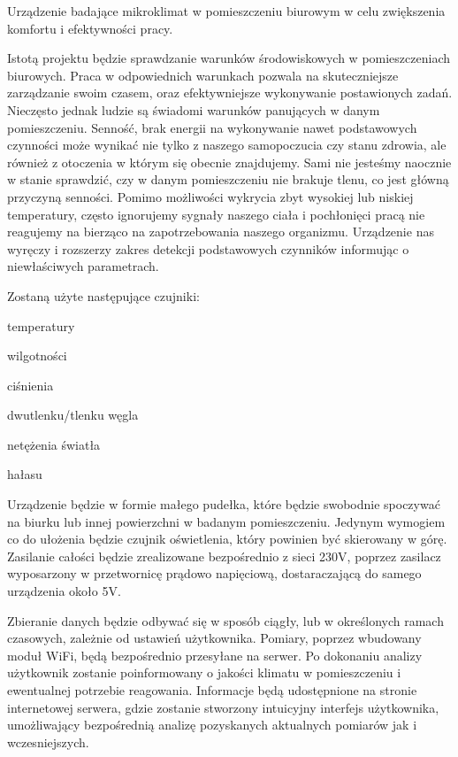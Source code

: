 \documentclass[10pt, a4paper]{article}
\begin{document}
Urządzenie badające mikroklimat w pomieszczeniu biurowym w celu zwiększenia komfortu i efektywności pracy.


Istotą projektu będzie sprawdzanie warunków środowiskowych w pomieszczeniach biurowych. 
Praca w odpowiednich warunkach pozwala na skuteczniejsze zarządzanie swoim czasem, oraz efektywniejsze wykonywanie postawionych zadań. Nieczęsto jednak ludzie są świadomi warunków panujących w danym pomieszczeniu. Senność, brak energii na wykonywanie nawet podstawowych czynności może wynikać nie tylko z naszego samopoczucia czy stanu zdrowia, ale również z otoczenia w którym się obecnie znajdujemy. Sami nie jesteśmy naocznie w stanie sprawdzić, czy w danym pomieszczeniu nie brakuje tlenu, co jest główną przyczyną senności. Pomimo możliwości wykrycia zbyt wysokiej lub niskiej temperatury, często ignorujemy sygnały naszego ciała i pochłonięci pracą nie reagujemy na bierząco na zapotrzebowania naszego organizmu. Urządzenie nas wyręczy i rozszerzy zakres detekcji podstawowych czynników informując o niewłaściwych parametrach.

Zostaną użyte następujące czujniki:

\begin{description}[font=$\bullet$~\normalfont]
\item temperatury
\item wilgotności
\item ciśnienia
\item dwutlenku/tlenku węgla
\item netężenia światła
\item hałasu
\end{description}

Urządzenie będzie w formie małego pudełka, które będzie swobodnie spoczywać na biurku lub innej powierzchni w badanym pomieszczeniu. Jedynym wymogiem co do ułożenia będzie czujnik oświetlenia, który powinien być skierowany w górę. Zasilanie całości będzie zrealizowane bezpośrednio z sieci 230V, poprzez zasilacz wyposarzony w przetwornicę prądowo napięciową, dostaraczającą do samego urządzenia około 5V.

Zbieranie danych będzie odbywać się w sposób ciągły, lub w określonych ramach czasowych, zależnie od ustawień użytkownika. Pomiary, poprzez wbudowany moduł WiFi, będą bezpośrednio przesyłane na serwer. Po dokonaniu analizy użytkownik zostanie poinformowany o jakości klimatu w pomieszczeniu i ewentualnej potrzebie reagowania. Informacje będą udostępnione na stronie internetowej serwera, gdzie zostanie stworzony intuicyjny interfejs użytkownika, umożliwający bezpośrednią analizę pozyskanych aktualnych pomiarów jak i wczesniejszych.
\end{document}
